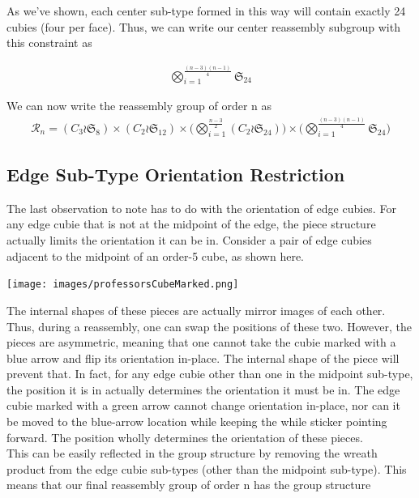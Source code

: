 \documentclass[10pt,letterpaper]{report}
\begin{document}
As we've shown, each center sub-type formed in this way will contain exactly 24 cubies (four per face).  Thus, we can write our center reassembly subgroup with this constraint as

\begin{align*}
\bigotimes_{i=1}^{\frac{(n-3)(n-1)}{4}}\mathfrak{S}_{24}
\end{align*}

We can now write the reassembly group of order n as \begin{align*}
\mathcal{R}_n = (C_3 \wr \mathfrak{S}_8) \times (C_2 \wr \mathfrak{S}_{12}) \times \Big( \bigotimes_{i=1}^{\frac{n-3}{2}} (C_2 \wr \mathfrak{S}_{24}) \Big) \times \Big( \bigotimes_{i=1}^{\frac{(n-3)(n-1)}{4}}\mathfrak{S}_{24} \Big)
\end{align*}

\subsection{Edge Sub-Type Orientation Restriction}
The last observation to note has to do with the orientation of edge cubies.  For any edge cubie that is not at the midpoint of the edge, the piece structure actually limits the orientation it can be in.  Consider a pair of edge cubies adjacent to the midpoint of an order-5 cube, as shown here.

\begin{center}
\texttt{[image: images/professorsCubeMarked.png]} 
\end{center}

The internal shapes of these pieces are actually mirror images of each other.  Thus, during a reassembly, one can swap the positions of these two.  However, the pieces are asymmetric, meaning that one cannot take the cubie marked with a blue arrow and flip its orientation in-place.  The internal shape of the piece will prevent that.  In fact, for any edge cubie other than one in the midpoint sub-type, the position it is in actually determines the orientation it must be in.  The edge cubie marked with a green arrow cannot change orientation in-place, nor can it be moved to the blue-arrow location while keeping the while sticker pointing forward.  The position wholly determines the orientation of these pieces. \\

This can be easily reflected in the group structure by removing the wreath product from the edge cubie sub-types (other than the midpoint sub-type).  This means that our final reassembly group of order n has the group structure
\end{document}
